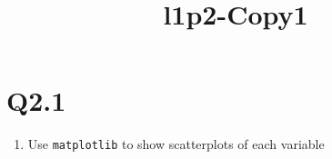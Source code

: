 \documentclass[11pt]{article}
\title{l1p2-Copy1}
\providecommand{\tightlist}{%
      \setlength{\itemsep}{0pt}\setlength{\parskip}{0pt}}
\begin{document}
    
    
    \maketitle
    
    

    
    \section{Q2.1}\label{q2.1}

    \begin{enumerate}
\def\labelenumi{\arabic{enumi}.}
\tightlist
\item
  Use \texttt{matplotlib} to show scatterplots of each variable
\end{enumerate}
\end{document}
